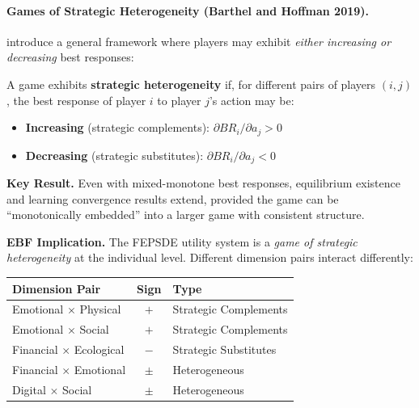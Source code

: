 \paragraph{Games of Strategic Heterogeneity (Barthel and Hoffman 2019).}

\citet{barthel2019rationalizability} introduce a general framework where players 
may exhibit \emph{either increasing or decreasing} best responses:

\begin{definition}
\label{def:strategic-heterogeneity}
A game exhibits \textbf{strategic heterogeneity} if, for different pairs of 
players $(i,j)$, the best response of player $i$ to player $j$'s action may be:
\begin{itemize}
    \item \textbf{Increasing} (strategic complements): $\partial BR_i / \partial a_j > 0$
    \item \textbf{Decreasing} (strategic substitutes): $\partial BR_i / \partial a_j < 0$
\end{itemize}
\end{definition}

\textbf{Key Result.}
Even with mixed-monotone best responses, equilibrium existence and learning 
convergence results extend, provided the game can be ``monotonically embedded'' 
into a larger game with consistent structure.

\textbf{EBF Implication.}
The FEPSDE utility system is a \emph{game of strategic heterogeneity} at the 
individual level. Different dimension pairs interact differently:

\begin{center}
\renewcommand{\arraystretch}{1.3}
\begin{tabular}{|l|c|l|}
\hline
\textbf{Dimension Pair} & \textbf{Sign} & \textbf{Type} \\
\hline
Emotional $\times$ Physical & $+$ & Strategic Complements \\
Emotional $\times$ Social & $+$ & Strategic Complements \\
Financial $\times$ Ecological & $-$ & Strategic Substitutes \\
Financial $\times$ Emotional & $\pm$ & Heterogeneous \\
Digital $\times$ Social & $\pm$ & Heterogeneous \\
\hline
\end{tabular}
\end{center}

